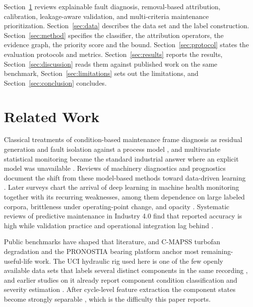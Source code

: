 \documentclass[journal]{IEEEtran}
\begin{document}
Section~\ref{sec:related} reviews explainable fault diagnosis, removal-based
attribution, calibration, leakage-aware validation, and multi-criteria maintenance
prioritization. Section~\ref{sec:data} describes the data set and the label
construction. Section~\ref{sec:method} specifies the classifier, the attribution
operators, the evidence graph, the priority score and the bound.
Section~\ref{sec:protocol} states the evaluation protocols and metrics.
Section~\ref{sec:results} reports the results, Section~\ref{sec:discussion} reads
them against published work on the same benchmark, Section~\ref{sec:limitations}
sets out the limitations, and Section~\ref{sec:conclusion} concludes.

\section{Related Work}
\label{sec:related}

Classical treatments of condition-based maintenance frame diagnosis as residual generation and fault isolation against a process model
\cite{Gertler1998FDD,Isermann2006FaultDiagnosis,Venkatasubramanian2003ReviewI}, and
multivariate statistical monitoring became the standard industrial answer where an
explicit model was unavailable \cite{Chiang2001FDD}. Reviews of machinery
diagnostics and prognostics document the shift from these model-based methods
toward data-driven learning
\cite{Jardine2006CBM,Lee2014PHM,Lei2018Prognostics}. Later surveys chart the
arrival of deep learning in machine health monitoring together with its recurring
weaknesses, among them dependence on large labeled corpora, brittleness under
operating-point change, and opacity \cite{Zhao2019DeepLearningMHM,Saufi2019Challenges}.
Systematic reviews of predictive maintenance in Industry 4.0 find that reported
accuracy is high while validation practice and operational integration lag behind
\cite{Carvalho2019SLR,Zonta2020PdMReview}.

Public benchmarks have shaped that literature, and C-MAPSS turbofan degradation
\cite{Saxena2008CMAPSS} and the PRONOSTIA bearing platform
\cite{Nectoux2012PRONOSTIA} anchor most remaining-useful-life work. The UCI
hydraulic rig used here is one of the few openly available data sets that labels
several distinct components in the same recording
\cite{Helwig2015Hydraulic,Dua2019UCI}, and earlier studies on it already report
component condition classification and severity estimation
\cite{Helwig2015Hydraulic,Schneider2017FeatureExtraction}. After cycle-level
feature extraction the component states become strongly separable
\cite{Schneider2017FeatureExtraction}, which is the difficulty this paper reports.
\end{document}
